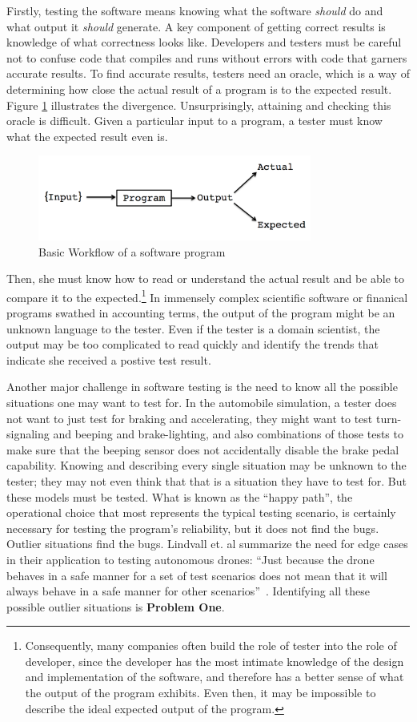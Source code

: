 Firstly, testing the software means knowing what the software \textit{should} do and what output it \textit{should} generate. A key component of getting correct results is knowledge of what correctness looks like. Developers and testers must be careful not to confuse code that compiles and runs without errors with code that garners accurate results. To find accurate results, testers need an oracle, which is a way of determining how close the actual result of a program is to the expected result. Figure \ref{fig:workflow} illustrates the divergence. Unsurprisingly, attaining and checking this oracle is difficult. Given a particular input to a program, a tester must know what the expected result even is. 
\begin{figure}
\centering
\includegraphics[width=90mm,scale=0.5]{diagram.png}
\caption{Basic Workflow of a software program}
\label{fig:workflow}
\end{figure}
Then, she must know how to read or understand the actual result and be able to compare it to the expected.\footnote{Consequently, many companies often build the role of tester into the role of developer, since the developer has the most intimate knowledge of the design and implementation of the software, and therefore has a better sense of what the output of the program exhibits. Even then, it may be impossible to describe the ideal expected output of the program.} In immensely complex scientific software or finanical programs swathed in accounting terms, the output of the program might be an unknown language to the tester. Even if the tester is a domain scientist, the output may be too complicated to read quickly and identify the trends that indicate she received a postive test result.

Another major challenge in software testing is the need to know all the possible situations one may want to test for. In the automobile simulation, a tester does not want to just test for braking and accelerating, they might want to test turn-signaling and beeping and brake-lighting, and also combinations of those tests to make sure that the beeping sensor does not accidentally disable the brake pedal capability. Knowing and describing every single situation may be unknown to the tester; they may not even think that that is a situation they have to test for. But these models must be tested. What is known as the ``happy path'', the operational choice that most represents the typical testing scenario, is certainly necessary for testing the program’s reliability, but it does not find the bugs. Outlier situations find the bugs. Lindvall et. al summarize the need for edge cases in their application to testing autonomous drones: ``Just because the drone behaves in a safe manner for a set of test scenarios does not mean that it will always behave in a safe manner for other scenarios''~\cite{Lindvall:2017:MMT:3103620.3103632}. Identifying all these possible outlier situations is \textbf{Problem One}.

